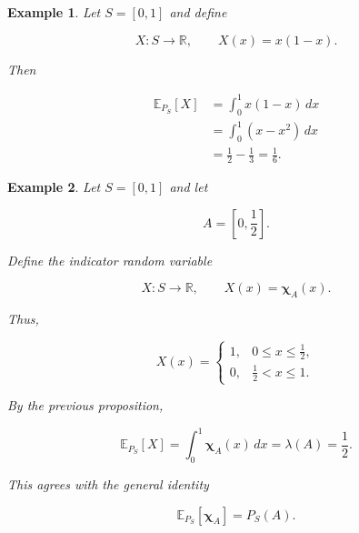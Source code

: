 \documentclass[10pt,a4paper]{book}
\newtheorem{example}{Example}[section]
\begin{document}
\begin{example}

    Let $S=[0,1]$ and define

    $$
        X:S\to\mathbb R,
        \qquad
        X(x)=x(1-x).
    $$

    Then

    $$
        \begin{aligned}
            \mathbb E_{P_S}[X]
             & =
            \int_0^1x(1-x)\,dx  \\
             & =
            \int_0^1(x-x^2)\,dx \\
             & =
            \frac12-\frac13
            =
            \frac16.
        \end{aligned}
    $$

\end{example}

\begin{example}

    Let $S=[0,1]$ and let

    $$
        A=\left[0,\frac12\right].
    $$

    Define the indicator random variable

    $$
        X:S\to\mathbb R,
        \qquad
        X(x)=\mathbf \chi_A(x).
    $$

    Thus,

    $$
        X(x)=
        \begin{cases}
            1, & 0\leq x\leq\frac12, \\
            0, & \frac12<x\leq1.
        \end{cases}
    $$

    By the previous proposition,

    $$
        \mathbb E_{P_S}[X]
        =
        \int_0^1\mathbf \chi_A(x)\,dx
        =
        \lambda(A)
        =
        \frac12.
    $$

    This agrees with the general identity

    $$
        \mathbb E_{P_S}[\mathbf \chi_A]=P_S(A).
    $$

\end{example}
\end{document}
